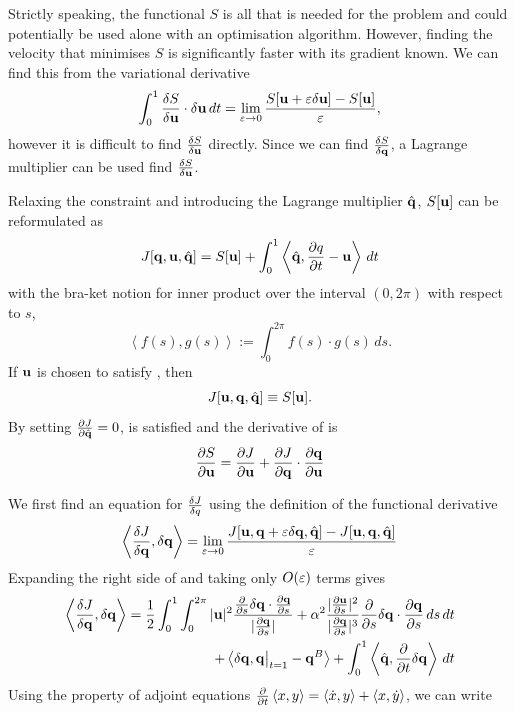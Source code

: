 \documentclass[a4paper, 12pt]{article}
\begin{document}
Strictly speaking, the functional $S$ is all that is needed for the problem and
could potentially be used alone with an optimisation algorithm. However, finding the
velocity that minimises $S$ is significantly faster with its gradient known. We can find this from the variational derivative
\begin{equation}
  \label{eq:lim_dS}
  \int^1_0 \frac{\delta S}{\delta \mathbf{u}}\cdot \delta \mathbf{u}\,dt = 
  \lim_{\varepsilon \rightarrow 0} \frac{S[\mathbf{u} + \varepsilon \delta \mathbf{u}] - S[\mathbf{u}]}{\varepsilon},
\end{equation}
 however it is difficult to find $\frac{\delta S}{\delta \mathbf{u}}$ directly. Since we can find $\frac{\delta S}{\delta \mathbf{q}}$, a Lagrange multiplier can be used find $\frac{\delta S}{\delta \mathbf{u}}$.

Relaxing the constraint  and introducing the Lagrange multiplier $\hat{\mathbf{q}}$, $S[\mathbf{u}]$ can be reformulated as
\begin{equation}
  \label{eq:J}
  J[\mathbf{q}, \mathbf{u}, \hat{\mathbf{q}}] = S[\mathbf{u}] + \int^1_0\left\langle \hat{\mathbf{q}} ,\frac{\partial q}{\partial t} - \mathbf{u}\right\rangle \,dt
\end{equation}
with the bra-ket notion for inner product over the interval $(0,2\pi)$ with respect to $s$,
\begin{equation}
  \left\langle f(s),g(s) \right\rangle := \int^{2\pi}_0 f(s) \cdot g(s)\,ds.
\end{equation}
If $\mathbf{u}$ is chosen to satisfy , then
\begin{equation}
  \label{eq:JeqS}
  J[\mathbf{u}, \mathbf{q}, \hat{\mathbf{q}}] \equiv S[\mathbf{u}].
\end{equation}
By setting $\frac{\partial J}{\partial \hat{\mathbf{q}}} = 0$,  is satisfied and the derivative of  is
\begin{equation}
  \label{eq:dSeqdJ}
  \frac{\partial S}{\partial \mathbf{u}} =  \frac{\partial J}{\partial \mathbf{u}} + \frac{\partial J}{\partial \mathbf{q}}\cdot\frac{\partial \mathbf{q}}{\partial \mathbf{u}}
\end{equation}

We first find an equation for  $\frac{\delta J}{\delta q}$ using the definition of the functional derivative 
\begin{equation}
  \label{eq:lim_dJdq}
  \left\langle \frac{\delta J}{\delta \mathbf{q}}, \delta \mathbf{q} \right\rangle =
  \lim_{\varepsilon \rightarrow 0} \frac{J[\mathbf{u}, \mathbf{q} + \varepsilon \delta \mathbf{q}, \hat{\mathbf{q}}] - J[\mathbf{u}, \mathbf{q}, \hat{\mathbf{q}}]}{\varepsilon}
\end{equation}
Expanding the right side of  and taking only $O(\varepsilon)$ terms gives
\begin{equation}
  \begin{split}
  \label{eq:dJdq}
  \left\langle \frac{\delta J}{\delta \mathbf{q}}, \delta \mathbf{q} \right\rangle =
  \frac{1}{2}\int^1_0\int^{2\pi}_0 |\mathbf{u}|^2
  \frac{\frac{\partial }{\partial s}\delta \mathbf{q} \cdot \frac{\partial \mathbf{q}}{\partial s}}{|\frac{\partial \mathbf{q}}{\partial s}|}
    + \alpha^2 \frac{|\frac{\partial \mathbf{u}}{\partial s}|^2}{|\frac{\partial \mathbf{q}}{\partial s}|^3} \frac{\partial }{\partial s}\delta \mathbf{q} \cdot \frac{\partial \mathbf{q}}{\partial s} \,ds\,dt  \\
    + \left\langle \delta \mathbf{q}, \mathbf{q}\big|_{t=1} - \mathbf{q}^B \right\rangle + \int^1_0\left\langle \hat{\mathbf{q}}, \frac{\partial }{\partial t} \delta \mathbf{q} \right\rangle\,dt
\end{split}
\end{equation}
Using the property of adjoint equations $\frac{\partial }{\partial t}\left\langle x,y \right\rangle = \left\langle \dot x, y \right\rangle + \left\langle x, \dot y \right\rangle$, we can write
\end{document}
